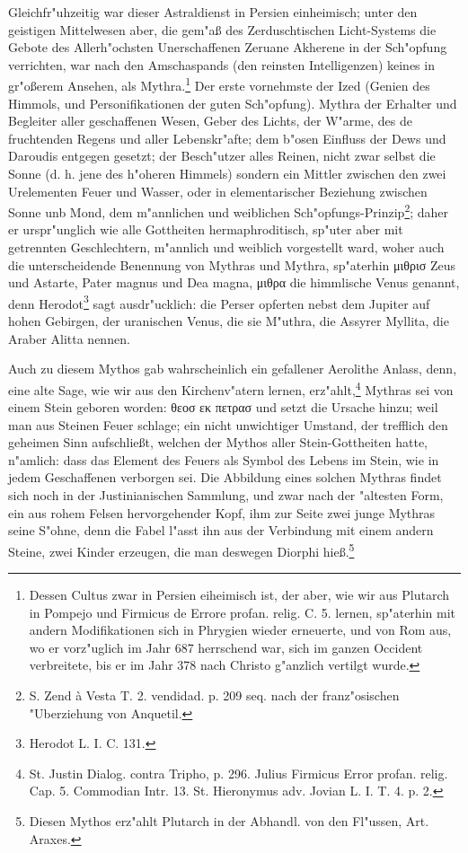 \documentclass[a4paper, 11pt, oneside, polutonikogreek, german]{article}
\begin{document}
Gleichfr"uhzeitig war dieser Astraldienst in Persien einheimisch; unter den geistigen Mittelwesen aber, die gem"aß des Zerduschtischen Licht-Systems die Gebote des Allerh"ochsten Unerschaffenen Zeruane Akherene in der Sch"opfung verrichten, war nach den Amschaspands (den reinsten Intelligenzen) keines in gr"oßerem Ansehen, als Mythra.\footnote{Dessen Cultus zwar in Persien eiheimisch ist, der aber, wie wir aus Plutarch in Pompejo und Firmicus de Errore profan. relig. C. 5. lernen, sp"aterhin mit andern Modifikationen sich in Phrygien wieder erneuerte, und von Rom aus, wo er vorz"uglich im Jahr 687 herrschend war, sich im ganzen Occident verbreitete, bis er im Jahr 378 nach Christo g"anzlich vertilgt wurde.} Der erste vornehmste der Ized (Genien des Himmols, und Personifikationen der guten Sch"opfung). Mythra der Erhalter und Begleiter aller geschaffenen Wesen, Geber des Lichts, der W"arme, des de fruchtenden Regens und aller Lebenskr"afte; dem b"osen Einfluss der Dews und Daroudis entgegen gesetzt; der Besch"utzer alles Reinen, nicht zwar selbst die Sonne (d. h. jene des h"oheren Himmels) sondern ein Mittler zwischen den zwei Urelementen Feuer und Wasser, oder in elementarischer Beziehung zwischen Sonne unb Mond, dem m"annlichen und weiblichen Sch"opfungs-Prinzip\footnote{S. Zend à Vesta T. 2. vendidad. p. 209 seq. nach der franz"osischen "Uberziehung von Anquetil.}; daher er urspr"unglich wie alle Gottheiten hermaphroditisch, sp"uter aber mit getrennten Geschlechtern, m"annlich und weiblich vorgestellt ward, woher auch die unterscheidende Benennung von Mythras und Mythra, sp"aterhin μιθρισ Zeus und Astarte, Pater magnus und Dea magna, μιθρα die himmlische Venus genannt, denn Herodot\footnote{Herodot L. I. C. 131.} sagt ausdr"ucklich: die Perser opferten nebst dem Jupiter auf hohen Gebirgen, der uranischen Venus, die sie M"uthra, die Assyrer Myllita, die Araber Alitta nennen.

Auch zu diesem Mythos gab wahrscheinlich ein gefallener Aerolithe Anlass, denn, eine alte Sage, wie wir aus den Kirchenv"atern lernen, erz"ahlt,\footnote{St. Justin Dialog. contra Tripho, p. 296. Julius Firmicus Error profan. relig. Cap. 5. Commodian Intr. 13. St. Hieronymus adv. Jovian L. I. T. 4. p. 2.} Mythras sei von einem Stein geboren worden: θεοσ εκ πετρασ und setzt die Ursache hinzu; weil man aus Steinen Feuer schlage; ein nicht unwichtiger Umstand, der trefflich den geheimen Sinn aufschließt, welchen der Mythos aller Stein-Gottheiten hatte, n"amlich: dass das Element des Feuers als Symbol des Lebens im Stein, wie in jedem Geschaffenen verborgen sei. Die Abbildung eines solchen Mythras findet sich noch in der Justinianischen Sammlung, und zwar nach der "altesten Form, ein aus rohem Felsen hervorgehender Kopf, ihm zur Seite zwei junge Mythras seine S"ohne, denn die Fabel l"asst ihn aus der Verbindung mit einem andern Steine, zwei Kinder erzeugen, die man deswegen Diorphi hieß.\footnote{Diesen Mythos erz"ahlt Plutarch in der Abhandl. von den Fl"ussen, Art. Araxes.}
\end{document}
